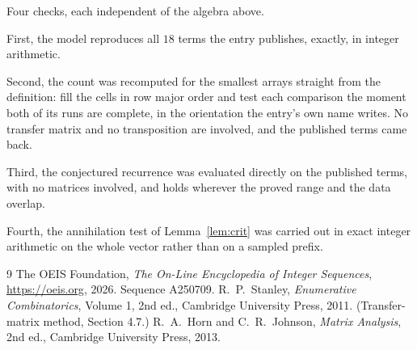\documentclass[11pt,a4paper]{article}
\theoremstyle{plain}
\theoremstyle{definition}
\begin{document}
Four checks, each independent of the algebra above.

First, the model reproduces all $18$ terms the entry publishes, exactly, in integer
arithmetic.

Second, the count was recomputed for the smallest arrays straight from the definition: fill the
cells in row major order and test each comparison the moment both of its runs are complete,
in the orientation the entry's own name writes. No transfer matrix and no transposition are
involved, and the published terms came back.

Third, the conjectured recurrence was evaluated directly on the published terms, with no
matrices involved, and holds wherever the proved range and the data overlap.

Fourth, the annihilation test of Lemma~\ref{lem:crit} was carried out in exact integer
arithmetic on the whole vector rather than on a sampled prefix.

\begin{thebibliography}{9}
 The OEIS Foundation, \emph{The On-Line Encyclopedia of Integer
Sequences}, \url{https://oeis.org}, 2026. Sequence A250709.
 R.~P.~Stanley, \emph{Enumerative Combinatorics}, Volume 1, 2nd ed.,
Cambridge University Press, 2011. (Transfer-matrix method, Section 4.7.)
 R.~A.~Horn and C.~R.~Johnson, \emph{Matrix Analysis}, 2nd ed., Cambridge
University Press, 2013.
\end{thebibliography}
\end{document}

